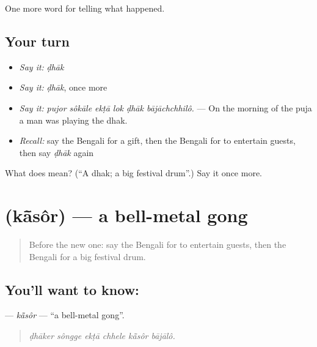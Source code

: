 \begin{grammarlens}[title={What you've built}]
One more word for telling what happened.
\end{grammarlens}

\subsection*{Your turn}
\begin{itemize}
\raggedright
  \item \emph{Say it:} \emph{ḍhāk}
  \item \emph{Say it:} \emph{ḍhāk}, once more
  \item \emph{Say it:} \emph{pujor sôkāle ekṭā lok ḍhāk bājāchchhilô.} — On the morning of the puja a man was playing the dhak.
  \item \emph{Recall:} say the Bengali for a gift, then the Bengali for to entertain guests, then say \emph{ḍhāk} again
\end{itemize}

\begin{tcolorbox}[breakable,colback=teal!4,colframe=teal!35!black,title={Before you move on}]
What does  mean? (\textquotedblleft{}A dhak; a big festival drum\textquotedblright{}.) Say it once more.
\end{tcolorbox}
\section[\texorpdfstring{\bn{কাঁসর} (kā̃sôr)}{কাঁসর (kā̃sôr)}]{ (kā̃sôr) — a bell-metal gong}

\label{lesson:BN-C307-kasor}



\begin{quote}
Before the new one: say the Bengali for to entertain guests, then the Bengali for a big festival drum.
\end{quote}

\subsection*{You'll want to know: }
\textbf{} — \emph{kā̃sôr} — \textquotedblleft{}a bell-metal gong\textquotedblright{}.

\begin{quote}
     
\end{quote}

\begin{quote}
\emph{ḍhāker sôngge ekṭā chhele kā̃sôr bājālô.}
\end{quote}

